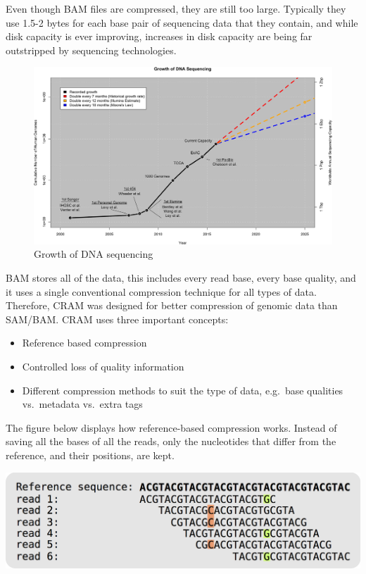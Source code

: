 \documentclass[11pt]{article}
\makeatletter
\def\maxwidth{\ifdim\Gin@nat@width>\linewidth\linewidth
    \else\Gin@nat@width\fi}
\let\Oldincludegraphics\includegraphics
\renewcommand{\includegraphics}[1]{\Oldincludegraphics[width=.8\maxwidth, height=.55\textheight, keepaspectratio]{#1}}
\providecommand{\tightlist}{%
      \setlength{\itemsep}{0pt}\setlength{\parskip}{0pt}}
\makeatother
\begin{document}
Even though BAM files are compressed, they are still too large.
Typically they use 1.5-2 bytes for each base pair of sequencing data
that they contain, and while disk capacity is ever improving, increases
in disk capacity are being far outstripped by sequencing technologies.

    \begin{figure}[!h]
\centering
\includegraphics{img/compression_cram.png}
\caption{Growth of DNA sequencing}
\end{figure}

    BAM stores all of the data, this includes every read base, every base
quality, and it uses a single conventional compression technique for all
types of data. Therefore, CRAM was designed for better compression of
genomic data than SAM/BAM. CRAM uses three important concepts:

\begin{itemize}
\tightlist
\item
  Reference based compression
\item
  Controlled loss of quality information
\item
  Different compression methods to suit the type of data, e.g.~base
  qualities vs.~metadata vs.~extra tags
\end{itemize}

The figure below displays how reference-based compression works. Instead
of saving all the bases of all the reads, only the nucleotides that
differ from the reference, and their positions, are kept.

    \includegraphics{img/CRAM_format.png}
\end{document}
